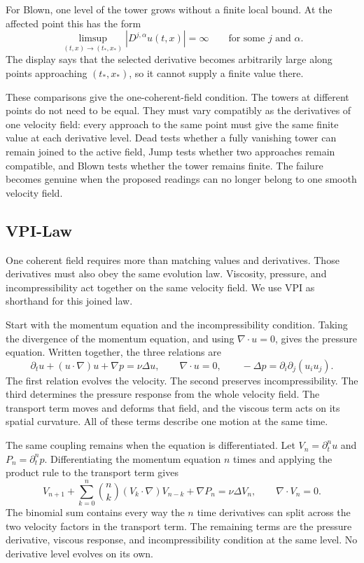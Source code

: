 For Blown, one level of the tower grows without a finite local bound.  At the
affected point this has the form
\[
  \limsup_{(t,x)\to(t_*,x_*)}
  \left|D^{j,\alpha}u(t,x)\right|=\infty
  \qquad\text{for some }j\text{ and }\alpha.
\]
The display says that the selected derivative becomes arbitrarily large along
points approaching \((t_*,x_*)\), so it cannot supply a finite value there.

These comparisons give the one-coherent-field condition.  The towers at
different points do not need to be equal.  They must vary compatibly as the
derivatives of one velocity field: every approach to the same point must give
the same finite value at each derivative level.  Dead tests whether a fully
vanishing tower can remain joined to the active field, Jump tests whether two
approaches remain compatible, and Blown tests whether the tower remains finite.
The failure becomes genuine when the proposed readings can no longer belong to
one smooth velocity field.

\subsection{VPI-Law}

One coherent field requires more than matching values and derivatives.  Those
derivatives must also obey the same evolution law.  Viscosity, pressure, and
incompressibility act together on the same velocity field.  We use VPI as
shorthand for this joined law.

Start with the momentum equation and the incompressibility condition.  Taking
the divergence of the momentum equation, and using \(\nabla\cdot u=0\), gives
the pressure equation.  Written together, the three relations are
\[
  \partial_tu+(u\cdot\nabla)u+\nabla p=\nu\Delta u,
  \qquad
  \nabla\cdot u=0,
  \qquad
  -\Delta p=\partial_i\partial_j(u_i u_j).
\]
The first relation evolves the velocity.  The second preserves
incompressibility.  The third determines the pressure response from the whole
velocity field.  The transport term moves and deforms that field, and the
viscous term acts on its spatial curvature.  All of these terms describe one
motion at the same time.

The same coupling remains when the equation is differentiated.  Let
\(V_n=\partial_t^nu\) and \(P_n=\partial_t^np\).  Differentiating the momentum
equation \(n\) times and applying the product rule to the transport term gives
\[
  V_{n+1}
  +\sum_{k=0}^{n}{n\choose k}(V_k\cdot\nabla)V_{n-k}
  +\nabla P_n
  =\nu\Delta V_n,
  \qquad
  \nabla\cdot V_n=0.
\]
The binomial sum contains every way the \(n\) time derivatives can split across
the two velocity factors in the transport term.  The remaining terms are the
pressure derivative, viscous response, and incompressibility condition at the
same level.  No derivative level evolves on its own.

